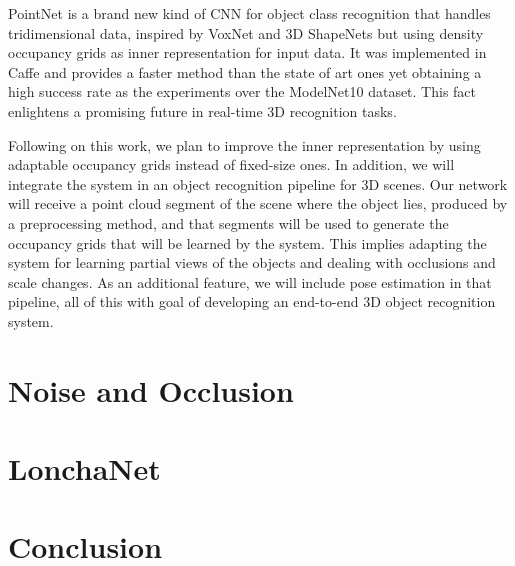 PointNet is a brand new kind of CNN for object class recognition that handles tridimensional data, inspired by VoxNet and 3D ShapeNets but using density occupancy grids as inner representation for input data. It was implemented in Caffe and provides a faster method than the state of art ones yet obtaining a high success rate as the experiments over the ModelNet10 dataset. This fact enlightens a promising future in real-time 3D recognition tasks.

Following on this work, we plan to improve the inner representation by using adaptable occupancy grids instead of fixed-size ones. In addition, we will integrate the system in an object recognition pipeline for 3D scenes. Our network will receive a point cloud segment of the scene where the object lies, produced by a preprocessing method, and that segments will be used to generate the occupancy grids that will be learned by the system. This implies adapting the system for learning partial views of the objects and dealing with occlusions and scale changes. As an additional feature, we will include pose estimation in that pipeline, all of this with goal of developing an end-to-end 3D object recognition system.

\section{Noise and Occlusion}
\label{cha:objrecog:sec:study}

\section{LonchaNet}
\label{cha:objrecog:sec:lonchanet}

\section{Conclusion}
\label{cha:objrecog:sec:conclusion}
